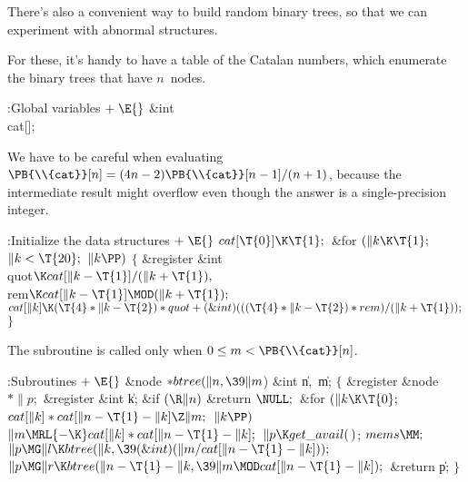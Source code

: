 There's also a convenient way to build random binary trees,
so that
we can experiment with abnormal structures.

For these, it's handy to have a table of the Catalan numbers, which
enumerate the binary trees that have $n$~nodes.

\Y\B\4:Global variables\X${}\mathrel+\E{}$\6
\&{int} \\{cat}[];\par
\fi

We have to be careful when evaluating $\PB{%
\\{cat}}[n]=(4n-2)\PB{\\{cat}}[n-1]/(n+1)$,
because the intermediate result might overflow even though the answer
is a single-precision integer.

\Y\B\4:Initialize the data structures\X${}\mathrel+\E{}$\6
$\\{cat}[\T{0}]\K\T{1};{}$\6
\&{for} ${}(\|k\K\T{1};{}$ ${}\|k<\T{20};{}$ ${}\|k\PP){}$\5
${}\{{}$\1\6
\&{register} \&{int} \\{quot}${}\K\\{cat}[\|k-\T{1}]/(\|k+\T{1}),{}$ \\{rem}${}%
\K\\{cat}[\|k-\T{1}]\MOD(\|k+\T{1});{}$\7
${}\\{cat}[\|k]\K(\T{4}*\|k-\T{2})*\\{quot}+(\&{int})(((\T{4}*\|k-\T{2})*%
\\{rem})/(\|k+\T{1}));{}$\6
\4${}\}{}$\2\par
\fi

The  subroutine is called only when $0\le m<%
\PB{\\{cat}}[n]$.

\Y\B\4:Subroutines\X${}\mathrel+\E{}$\6
\&{node} ${}{*}\\{btree}(\|n,\39\|m{}$)\1\1\6
\&{int} \|n${},{}$ \|m;\2\2\6
${}\{{}$\1\6
\&{register} \&{node} ${}{*}\|p;{}$\6
\&{register} \&{int} \|k;\7
\&{if} ${}(\R\|n){}$\1\5
\&{return} ${}\NULL;{}$\2\6
\&{for} ${}(\|k\K\T{0};{}$ ${}\\{cat}[\|k]*\\{cat}[\|n-\T{1}-\|k]\Z\|m;{}$ ${}%
\|k\PP){}$\1\5
${}\|m\MRL{-{\K}}\\{cat}[\|k]*\\{cat}[\|n-\T{1}-\|k];{}$\2\6
${}\|p\K\\{get\_avail}(\,){}$;\5
${}\\{mems}\MM;{}$\6
${}\|p\MG\|l\K\\{btree}(\|k,\39(\&{int})(\|m/\\{cat}[\|n-\T{1}-\|k]));{}$\6
${}\|p\MG\|r\K\\{btree}(\|n-\T{1}-\|k,\39\|m\MOD\\{cat}[\|n-\T{1}-\|k]);{}$\6
\&{return} \|p;\6
\4${}\}{}$\2\par
\fi

